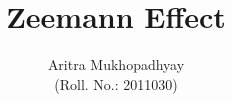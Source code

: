 \documentclass[10pt]{article}
\title{\textbf{Zeemann Effect}}
\author{Aritra Mukhopadhyay\\(Roll. No.: 2011030)}
\begin{document}
    \maketitle
    \begin{multicols*}{2}
        
        
        
        
        

        
        
        \nocite{*}
    \end{multicols*}
\end{document}
